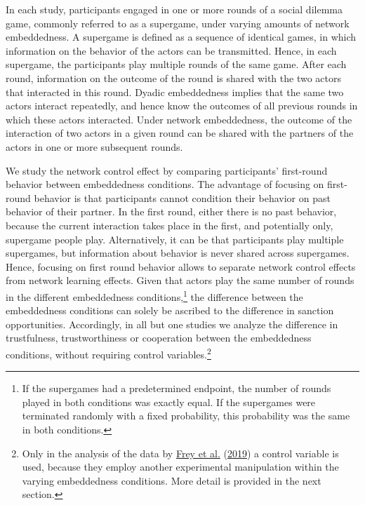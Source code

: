 \documentclass[
  11pt,
]{article}
\begin{document}
In each study, participants engaged in one or more rounds of a social dilemma game, commonly referred to as a supergame, under varying amounts of network embeddedness.
A supergame is defined as a sequence of identical games, in which information on the behavior of the actors can be transmitted.
Hence, in each supergame, the participants play multiple rounds of the same game.
After each round, information on the outcome of the round is shared with the two actors that interacted in this round.
Dyadic embeddedness implies that the same two actors interact repeatedly, and hence know the outcomes of all previous rounds in which these actors interacted.
Under network embeddedness, the outcome of the interaction of two actors in a given round can be shared with the partners of the actors in one or more subsequent rounds.

We study the network control effect by comparing participants' first-round behavior between embeddedness conditions.
The advantage of focusing on first-round behavior is that participants cannot condition their behavior on past behavior of their partner.
In the first round, either there is no past behavior, because the current interaction takes place in the first, and potentially only, supergame people play.
Alternatively, it can be that participants play multiple supergames, but information about behavior is never shared across supergames.
Hence, focusing on first round behavior allows to separate network control effects from network learning effects.
Given that actors play the same number of rounds in the different embeddedness conditions,\footnote{
  If the supergames had a predetermined endpoint, the number of rounds played in both conditions was exactly equal. If the supergames were terminated randomly with a fixed probability, this probability was the same in both conditions.}
the difference between the embeddedness conditions can solely be ascribed to the difference in sanction opportunities.
Accordingly, in all but one studies we analyze the difference in trustfulness, trustworthiness or cooperation between the embeddedness conditions, without requiring control variables.\footnote{Only in the analysis of the data by \protect\hyperlink{ref-frey_buskens_investments_2019}{Frey et al.} (\protect\hyperlink{ref-frey_buskens_investments_2019}{2019}) a control variable is used, because they employ another experimental manipulation within the varying embeddedness conditions. More detail is provided in the next section.}
\end{document}
